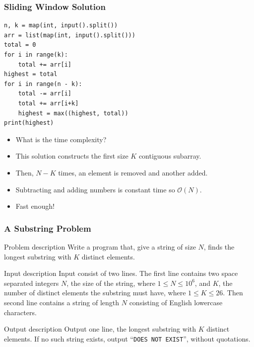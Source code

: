 \documentclass{beamer}
\begin{document}
\begin{frame}
    \frametitle{Sliding Window Solution}
	\begin{scriptsize}
        \begin{verbatim}
n, k = map(int, input().split())
arr = list(map(int, input().split()))
total = 0
for i in range(k):
    total += arr[i]
highest = total
for i in range(n - k):
    total -= arr[i]
    total += arr[i+k]
    highest = max((highest, total))
print(highest)
        \end{verbatim}
    \end{scriptsize}
    \begin{itemize}
        \item<2-> What is the time complexity?
        \item<3-> This solution constructs the first size $K$ contiguous subarray.
        \item<4-> Then, $N-K$ times, an element is removed and another added.
        \item<5-> Subtracting and adding numbers is constant time so $\mathcal{O}(N)$.
        \item<6-> Fast enough!
    \end{itemize}
\end{frame}

\begin{frame}[plain]
	\frametitle{A Substring Problem}
	\begin{block}{Problem description}
    	    Write a program that, give a string of size $N$, finds the
            longest substring with $K$ distinct elements.
    \end{block}

    \vspace{10pt}
    
    \begin{block}{Input description}
            Input consist of two lines.
            The first line contains two space separated integers $N$, the size of the string, where $1 \leq N \leq 10^6$,
    and $K$, the number of distinct elements the substring must have, where $1 \leq K \leq 26$.
            Then second line contains a string of length $N$ consisting of English lowercase characters.
    \end{block}

    \vspace{10pt}
    
    \begin{block}{Output description}
            Output one line, the longest substring with $K$ distinct elements.
            If no such string exists, output ``\texttt{DOES NOT EXIST}'', without quotations.
    \end{block}
\end{frame}
\end{document}
